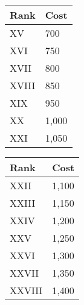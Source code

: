 \begin{minipage}{0.25\textwidth}
    \begin{tabular}{l | l}
        Rank & Cost\\ \hline
        XV & 700\\
        XVI & 750\\
        XVII & 800\\
        XVIII & 850\\
        XIX & 950\\
        XX & 1,000\\
        XXI & 1,050\\
    \end{tabular}
\end{minipage}
\begin{minipage}{0.25\textwidth}
    \begin{tabular}{l | l}
        Rank & Cost\\ \hline
        XXII & 1,100\\
        XXIII & 1,150\\
        XXIV & 1,200\\
        XXV & 1,250\\
        XXVI & 1,300\\
        XXVII & 1,350\\
        XXVIII & 1,400\\
    \end{tabular}
\end{minipage}

























